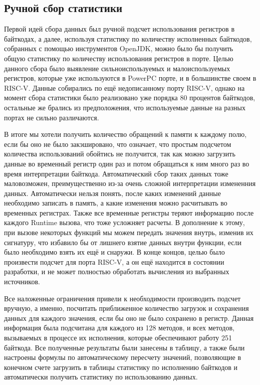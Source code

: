 \subsection{Ручной сбор статистики}

Первой идей сбора данных был ручной подсчет использования регистров в байткодах, а далее, используя статистику по количеству исполненных байткодов, собранных с помощью инструментов OpenJDK, можно было бы получить общую статистику по количеству использования регистров в порте. Целью данного сбора было выявление сильноиспользуемых и малоиспользуемых регистров, которые уже используются в PowerPC порте, и в большинстве своем в RISC-V. Данные собирались по ещё недописанному порту RISC-V, однако на момент сбора статистики было реализовано уже порядка 80 процентов байткодов, остальные же брались из предположения, что используемые данные на разных портах не сильно различаются.

В итоге мы хотели получить количество обращений к памяти к каждому полю, если бы оно не было закэшировано, что означает, что простым подсчетом количества использований обойтись не получится, так как можно загрузить данные во временный регистр один раз и потом обращаться к ним много раз во время интерпретации байткода. Автоматический сбор таких данных тоже маловозможен, преимущественно из-за очень сложной интерпретации измененния данных. Автоматически нельзя понять, после каких изменений данные необходимо записать в память, а какие изменения можно расчитывать во временных регистрах. Также все временные регистры теряют информацию после каждого Runtime вызова, что тоже усложняет расчеты. В дополнение к этому, при вызове некоторых функций мы можем передать значения внутрь, изменив их сигнатуру, что избавило бы от лишнего взятие данных внутри функции, если было необходимо взять их ещё и снаружи. В конце концов, целью было произвести подсчет для порта RISC-V, а он ещё находится в состоянии разработки, и не может полностью обработать вычисления из выбранных источников. 

Все наложенные ограничения привели к необходимости производить подсчет вручную, а именно, посчитать приближенное количество загрузок и сохранения данных для каждого значения, если бы оно не было сохранено в регистр. Данная информация была подсчитана для каждого из 128 методов, и всех методов, вызываемых в процессе их исполнения, которые обеспечивают работу 251 байткода. Все полученные результаты были занесены в таблицу, а также были настроены формулы по автоматическому пересчету значений, позволяющие в конечном счете загрузить в таблицы статистику по исполнению байткодов и автоматически получить статистику по использованию данных.

